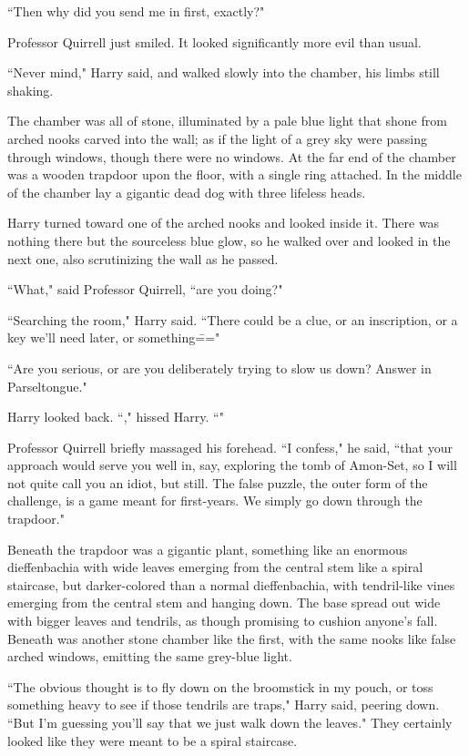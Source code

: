 ``Then why did you send me in first, exactly?"

Professor Quirrell just smiled. It looked significantly more evil than usual.

``Never mind," Harry said, and walked slowly into the chamber, his limbs still shaking.

The chamber was all of stone, illuminated by a pale blue light that shone from arched nooks carved into the wall; as if the light of a grey sky were passing through windows, though there were no windows. At the far end of the chamber was a wooden trapdoor upon the floor, with a single ring attached. In the middle of the chamber lay a gigantic dead dog with three lifeless heads.

Harry turned toward one of the arched nooks and looked inside it. There was nothing there but the sourceless blue glow, so he walked over and looked in the next one, also scrutinizing the wall as he passed.

``What," said Professor Quirrell, ``are you doing?"

``Searching the room," Harry said. ``There could be a clue, or an inscription, or a key we'll need later, or something\==="

``Are you serious, or are you deliberately trying to slow us down? Answer in Parseltongue."

Harry looked back. ``," hissed Harry. ``"

Professor Quirrell briefly massaged his forehead. ``I confess," he said, ``that your approach would serve you well in, say, exploring the tomb of Amon-Set, so I will not quite call you an idiot, but still. The false puzzle, the outer form of the challenge, is a game meant for first-years. We simply go down through the trapdoor."

Beneath the trapdoor was a gigantic plant, something like an enormous dieffenbachia with wide leaves emerging from the central stem like a spiral staircase, but darker-colored than a normal dieffenbachia, with tendril-like vines emerging from the central stem and hanging down. The base spread out wide with bigger leaves and tendrils, as though promising to cushion anyone's fall. Beneath was another stone chamber like the first, with the same nooks like false arched windows, emitting the same grey-blue light.

``The obvious thought is to fly down on the broomstick in my pouch, or toss something heavy to see if those tendrils are traps," Harry said, peering down. ``But I'm guessing you'll say that we just walk down the leaves." They certainly looked like they were meant to be a spiral staircase.

